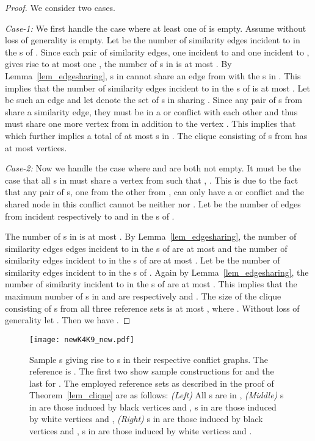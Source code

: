 \documentclass[final]{dmtcs-episciences}
\newcommand\mar[1]{\textcolor{black}{#1}}
\begin{document}
\begin{proof} 
We consider two cases. 

 \emph{ Case-1:} We first handle the case where at least one of  is empty. 
Assume without loss of generality  is empty. Let  be the number of similarity edges
incident to  in the s of . Since each pair of similarity edges, one incident to  and one
incident to , gives rise to at most 
one , the number of s in  is at most . 
By Lemma~\ref{lem_edgesharing}, s in 
cannot share an edge from  with the s in . This implies that the 
number of similarity  edges incident to  in the s of  is at most . 
Let  be such an edge and let  denote the set of s in  sharing . Since any pair of s from  share a similarity edge, they 
must be in a  or   conflict with each other
and thus must share one more vertex from 
in addition to the vertex . This implies that  which further implies a total of at most  s in . 
The clique consisting of s from  has at most  vertices. 

 \emph{ Case-2:} Now we handle the case where  and  are both not empty. 
It must be the case that all s in  must share a vertex  from 
such that , . This is due to the fact that any pair of s, one from  the other from ,
can only have a  or  conflict and the shared node in \mar{this} conflict cannot be neither  nor . 
Let  be the number of edges from  incident respectively to  and  in the s of . 

The number of s in  is at most . 
By Lemma~\ref{lem_edgesharing}, the 
number of similarity edges edges incident to  in the s of  are at most  and 
the number of similarity edges incident to  in the s of  are at most .
Let  be the number of 
similarity edges incident to  in the s of . Again by Lemma~\ref{lem_edgesharing},
the number of similarity incident to  in the s of  are at most .
This implies that the maximum number of s in  and  are respectively 
and . The size of the clique consisting of 
s from all three reference sets 
is at most , where .
Without loss of generality let . Then we have
.
\end{proof}

\begin{figure}[t]	   
\begin{center}	   
\hspace*{-.3cm}
\texttt{[image: newK4K9\_new.pdf]} 
\caption{\sf Sample s giving rise to s in their
respective conflict graphs.
The reference  is . The first two  show sample constructions for  and the last for .
The employed reference sets as
described in the proof of Theorem~\ref{lem_clique} are as follows:  \emph{ (Left)} All s are in , 
 \emph{ (Middle)} s in  are those induced by black vertices and , s in  are those induced by 
white vertices and , 
 \emph{ (Right)} s in  are those induced by black vertices and , s in  are those induced by 
white vertices and . 
} 
\label{cliquesample}	   
\end{center}	   
\end{figure}  
\end{document}
